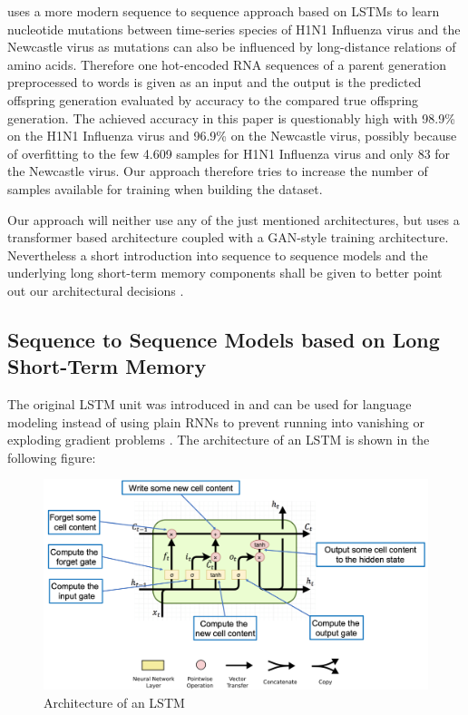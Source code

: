 \cite{Mohamed2021} uses a more modern sequence to sequence approach based on \acp{LSTM} to learn nucleotide mutations between time-series species of H1N1 Influenza virus and the Newcastle virus as mutations can also be influenced by long-distance relations of amino acids. Therefore one hot-encoded \ac{RNA} sequences of a parent generation preprocessed to words is given as an input and the output is the predicted offspring generation evaluated by accuracy to the compared true offspring generation. The achieved accuracy in this paper is questionably high with 98.9\% on the H1N1 Influenza virus and 96.9\% on the Newcastle virus, possibly because of overfitting to the few 4.609 samples for H1N1 Influenza virus and only 83 for the Newcastle virus. Our approach therefore tries to increase the number of samples available for training when building the dataset. 

Our approach will neither use any of the just mentioned architectures, but uses a transformer based architecture coupled with a GAN-style training architecture. Nevertheless a short introduction into sequence to sequence models and the underlying long short-term memory components shall be given to better point out our architectural decisions . 

\subsection{Sequence to Sequence Models based on Long Short-Term Memory} \label{fundamentalsE}


The original \ac{LSTM} unit was introduced in \cite{Hochreiter1997} and can be used for language modeling instead of using plain \acp{RNN} to prevent running into vanishing or exploding gradient problems \cite{Sundermeyer2012}. The architecture of an \ac{LSTM} is shown in the following figure:

\begin{figure}[ht]
	\centering
	\includegraphics[width=\linewidth]{figures/lstm_architecture.png}
	\caption{Architecture of an \ac{LSTM} \cite{Gertz2020}}
	\label{lstm_architecture}
\end{figure}

